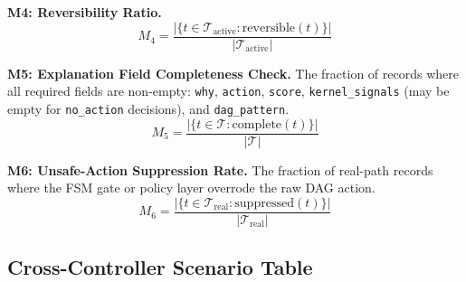 \documentclass[conference]{IEEEtran}
\begin{document}
\textbf{M4: Reversibility Ratio.}
\begin{equation}
M_4 = \frac{|\{t \in \mathcal{T}_{\mathrm{active}} : \mathrm{reversible}(t)\}|}{|\mathcal{T}_{\mathrm{active}}|}
\label{eq:M4}
\end{equation}

\textbf{M5: Explanation Field Completeness Check.} The fraction of records where all required fields are non-empty: \texttt{why}, \texttt{action}, \texttt{score}, \texttt{kernel\_signals} (may be empty for \texttt{no\_action} decisions), and \texttt{dag\_pattern}.
\begin{equation}
M_5 = \frac{|\{t \in \mathcal{T} : \mathrm{complete}(t)\}|}{|\mathcal{T}|}
\label{eq:M5}
\end{equation}

\textbf{M6: Unsafe-Action Suppression Rate.} The fraction of real-path records where the FSM gate or policy layer overrode the raw DAG action.
\begin{equation}
M_6 = \frac{|\{t \in \mathcal{T}_{\mathrm{real}} : \mathrm{suppressed}(t)\}|}{|\mathcal{T}_{\mathrm{real}}|}
\label{eq:M6}
\end{equation}

\subsection{Cross-Controller Scenario Table}
\end{document}
